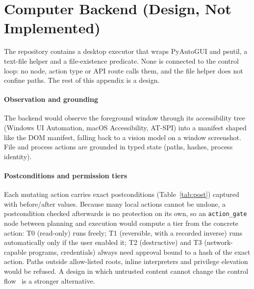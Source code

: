

\section{Computer Backend (Design, Not Implemented)}
\label{app:computer}

The repository contains a desktop executor that wraps PyAutoGUI and psutil, a text-file helper and a file-existence predicate. None is connected to the control loop: no node, action type or API route calls them, and the file helper does not confine paths. The rest of this appendix is a design.

\paragraph{Observation and grounding} The backend would observe the foreground window through its accessibility tree (Windows UI Automation, macOS Accessibility, AT-SPI) into a manifest shaped like the DOM manifest, falling back to a vision model on a window screenshot. File and process actions are grounded in typed state (paths, hashes, process identity).

\paragraph{Postconditions and permission tiers} Each mutating action carries exact postconditions (Table~\ref{tab:post}) captured with before/after values. Because many local actions cannot be undone, a postcondition checked afterwards is no protection on its own, so an \texttt{action\_gate} node between planning and execution would compute a tier from the concrete action: T0 (read-only) runs freely; T1 (reversible, with a recorded inverse) runs automatically only if the user enabled it; T2 (destructive) and T3 (network-capable programs, credentials) always need approval bound to a hash of the exact action. Paths outside allow-listed roots, inline interpreters and privilege elevation would be refused. A design in which untrusted content cannot change the control flow~\cite{debenedetti2025camel} is a stronger alternative.



